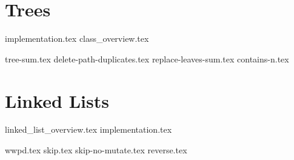 \documentclass{exam}
\begin{document}
\newpage
\section{Trees}
{implementation.tex}
{class_overview.tex}
\begin{questions}
    {tree-sum.tex}
    \newpage
    {delete-path-duplicates.tex}
    {replace-leaves-sum.tex}
    {contains-n.tex}
\end{questions}

\section{Linked Lists}
{linked_list_overview.tex}
{implementation.tex}
\newpage
\begin{questions}
{wwpd.tex}
\newpage
{skip.tex}
{skip-no-mutate.tex}
{reverse.tex}
\end{questions}
\end{document}
